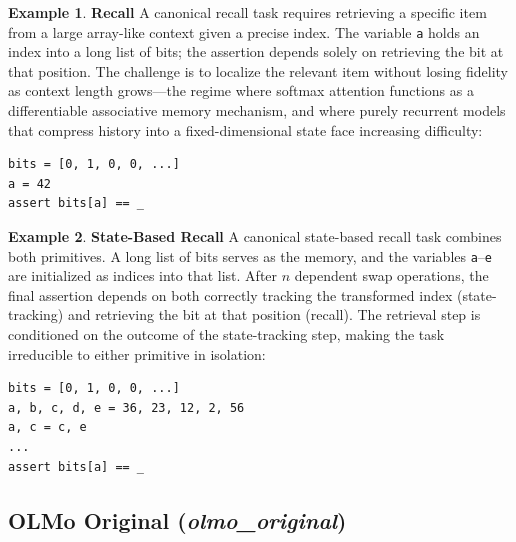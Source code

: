 \documentclass[11pt]{article}
\theoremstyle{definition}
\newtheorem{example}{Example}
\begin{document}
\begin{example}
\label{ex:recall}
\textbf{Recall}  A canonical recall task requires retrieving a specific item from a large array-like context given a precise index. The variable \texttt{a} holds an index into a long list of bits; the assertion depends solely on retrieving the bit at that position. The challenge is to localize the relevant item without losing fidelity as context length grows---the regime where softmax attention functions as a differentiable associative memory mechanism, and where purely recurrent models that compress history into a fixed-dimensional state face increasing difficulty:

\begin{tcolorbox}[colback=gray!5!white, colframe=gray!75!black, title=Toxicity Evaluation Prompt, breakable]
\small

\begin{verbatim}
bits = [0, 1, 0, 0, ...]
a = 42
assert bits[a] == _
\end{verbatim}

\end{tcolorbox}
\end{example}
 
\begin{example}
\label{ex:state-based-recall}
\textbf{State-Based Recall} A canonical state-based recall task combines both primitives. A long list of bits serves as the memory, and the variables \texttt{a}--\texttt{e} are initialized as indices into that list. After $n$ dependent swap operations, the final assertion depends on both correctly tracking the transformed index (state-tracking) and retrieving the bit at that position (recall). The retrieval step is conditioned on the outcome of the state-tracking step, making the task irreducible to either primitive in isolation:

\begin{tcolorbox}[colback=gray!5!white, colframe=gray!75!black, title=Toxicity Evaluation Prompt, breakable]
\small

\begin{verbatim}
bits = [0, 1, 0, 0, ...]
a, b, c, d, e = 36, 23, 12, 2, 56
a, c = c, e
...
assert bits[a] == _
\end{verbatim}

\end{tcolorbox}
\end{example}

\subsection{OLMo Original (\textit{olmo\_original})}
\end{document}
